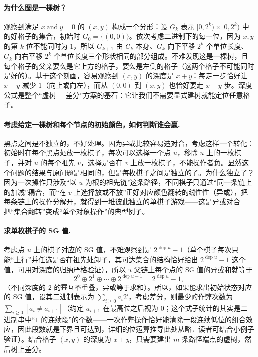 \documentclass[UTF8,a4paper,11pt,oneside,openany,fontset=fandol]{ctexbook}
\theoremstyle{definition}
\newcommand{\dep}{\operatorname{dep}}
\newcommand{\iva}[1]{\left[#1\right]}
\begin{document}
\paragraph{为什么图是一棵树？} 观察到满足 $x\ \mathrm{and}\ y=0$ 的 $(x,y)$ 构成一个分形：设 $G_k$ 表示 $[0,2^{k})\times[0,2^{k})$ 中的好格子的集合，初始时 $G_0=\{(0,0)\}$。依次考虑二进制下的每一位，因为 $x,y$ 的第 $k$ 位不能同时为 $1$，所以 $G_{k+1}$ 由 $G_k$ 本身、$G_k$ 向下平移 $2^{k}$ 个单位长度、$G_k$ 向右平移 $2^{k}$ 个单位长度三个形状相同的部分组成。不难发现这是一棵树，且每个格子的父亲要么是它上方的格子，要么是左侧的格子（这两个格子不可能同时是好的）。基于这个刻画，容易观察到 $(x,y)$ 的深度是 $x+y$：每走一步恰好让 $x+y$ 减少 $1$（向上或向左），而从 $(0,0)$ 到 $(x,y)$ 也恰好要走 $x+y$ 步。深度公式是整个“虚树 + 差分”方案的基石：它让我们不需要显式建树就能定位任意格子。

\paragraph{考虑给定一棵树和每个节点的初始颜色，如何判断谁会赢.} 黑点之间是不独立的，不好处理。因为异或比较容易造对合，考虑这样一个转化：初始时在每个黑点处放一枚棋子，每次可以选择一个点 $u$，移除 $u$ 上的一枚棋子，并对 $u$ 的每个祖先 $v$，选择是否在 $v$ 上放一枚棋子，不能操作者负。显然这个问题的结果与原问题是相同的，但是每枚棋子之间是独立的了。为什么独立了？因为一次操作只涉及“以 $u$ 为根的祖先链”这条路径，不同棋子只通过“同一条链上的加减”耦合，而“在 $v$ 上选择放或不放”正好对应颜色翻转的线性性（异或），把每条链上的操作分解开，就得到一堆彼此独立的单棋子游戏——这是异或对合把“集合翻转”变成“单个对象操作”的典型例子。

\paragraph{求单枚棋子的 SG 值.} 考虑点 $u$ 上的棋子对应的 SG 值，不难观察到是 $2^{\dep u}-1$（单个棋子每次只能“上行”并任选是否在祖先处卸子，其可达集合的结构恰好给出 $2^{\dep u}-1$ 这个值，可用对深度的归纳严格验证），所以 $u$ 父链上每个点的 SG 值的异或和就等于
\[
 2^{0}\oplus2^{1}\oplus\cdots\oplus2^{\dep u-1}=2^{\dep u}-1,
\]
（不同深度的 $2$ 的幂互不重叠，异或等于求和）。所以，如果能求出初始状态对应的 SG 值，设其二进制表示为 $\sum_{i\ge0}a_i2^{i}$，考虑差分，则最少的作弊次数为 $\sum_{i\ge0}\iva{a_i\ne a_{i+1}}$（约定 $a_{i+1}$ 在最高位之后视为 $0$；这个式子统计的其实是二进制串中“$1$ 的连续段”的个数——一次作弊操作恰好能清除一段连续低位的组合效应，因此段数就是下界且可达到，详细的位运算推导此处从略，读者可结合小例子验证）。结合格子 $(x,y)$ 的深度为 $x+y$，只需要建出 $m$ 条路径端点的虚树，然后树上差分。
\end{document}
